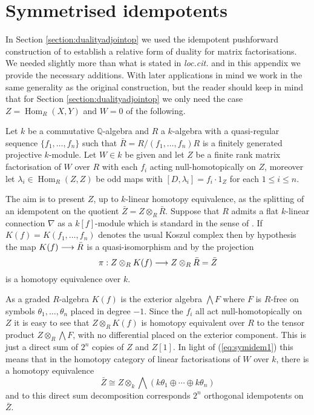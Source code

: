 \documentclass{compositio}
\theoremstyle{definition}
\numberwithin{equation}{section}
\def\Hom{\operatorname{Hom}}
\begin{document}
\section{Symmetrised idempotents}\label{section:symidem}

In Section \ref{section:dualityadjointop} we used the idempotent pushforward construction of \cite{dm1102.2957} to establish a relative form of duality for matrix factorisations. We needed slightly more than what is stated in \emph{loc.cit.} and in this appendix we provide the necessary additions. With later applications in mind we work in the same generality as the original construction, but the reader should keep in mind that for Section \ref{section:dualityadjointop} we only need the case $Z = \Hom_R(X,Y)$ and $W = 0$ of the following.

Let $k$ be a commutative $\mathbb{Q}$-algebra and $R$ a $k$-algebra with a quasi-regular sequence $\{ f_1, \ldots, f_n \}$ such that $\bar{R} = R/(f_1,\ldots,f_n)R$ is a finitely generated projective $k$-module. Let $W \in k$ be given and let $Z$ be a finite rank matrix factorisation of $W$ over $R$ with each $f_i$ acting null-homotopically on $Z$, moreover let $\lambda_i \in \Hom_R(Z,Z)$ be odd maps with $[D, \lambda_i] = f_i \cdot 1_Z$ for each $1 \le i \le n$.

The aim is to present $Z$, up to $k$-linear homotopy equivalence, as the splitting of an idempotent on the quotient $\bar{Z} = Z \otimes_R \bar{R}$. Suppose that $R$ admits a flat $k$-linear connection $\nabla$ as a $k[f]$-module which is standard in the sense of \cite{??}. If $K(f) = K(f_1,\ldots,f_n)$ denotes the usual Koszul complex then by hypothesis the map $K(f) \longrightarrow \bar{R}$ is a quasi-isomorphism and by \cite[Section 10]{dm1102.2957} the projection
\begin{equation}\label{eq:symidem1}
\pi: Z \otimes_R K(f) \longrightarrow Z \otimes_R \bar{R} = \bar{Z}
\end{equation}
is a homotopy equivalence over $k$. 

As a graded $R$-algebra $K(f)$ is the exterior algebra $\bigwedge F$ where $F$ is $R$-free on symbols $\theta_1,\ldots,\theta_n$ placed in degree $-1$. Since the $f_i$ all act null-homotopically on $Z$ it is easy to see that $Z \otimes_R K(f)$ is homotopy equivalent over $R$ to the tensor product $Z \otimes_R \bigwedge F$, with no differential placed on the exterior component. This is just a direct sum of $2^n$ copies of $Z$ and $Z[1]$. In light of (\ref{eq:symidem1}) this means that in the homotopy category of linear factorisations of $W$ over $k$, there is a homotopy equivalence
\[
\bar{Z} \cong Z \otimes_k \bigwedge (k\theta_1 \oplus \cdots \oplus k\theta_n)
\]
and to this direct sum decomposition corresponds $2^n$ orthogonal idempotents on $\bar{Z}$.
\end{document}
